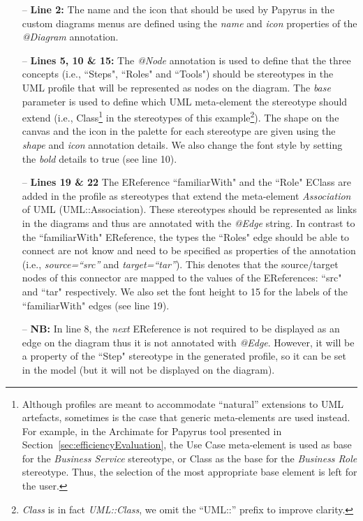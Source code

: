 \begin{itemize}
	\item[--] \textbf{Line 2:} The name and the icon that should be used by Papyrus in the custom diagrams menus are defined using the \textit{name} and \textit{icon} properties of the \textit{@Diagram} annotation.
	\item[--] \textbf{Lines 5, 10 \& 15:} The \textit{@Node} annotation is used to define that the three concepts (i.e., ``Steps", ``Roles" and ``Tools") should be stereotypes in the UML profile that will be represented as nodes on the diagram. 
	The \textit{base} parameter is used to define which UML meta-element the stereotype should extend (i.e., Class\footnote{Although profiles are meant to accommodate ``natural'' extensions to UML artefacts, sometimes is the case that generic meta-elements are used instead. 
	For example, in the Archimate for Papyrus tool presented in Section~\ref{sec:efficiencyEvaluation}, the Use Case meta-element is used as base for the \textit{Business Service} stereotype, or Class as the base for the \textit{Business Role} stereotype. 
	Thus, the selection of the most appropriate base element is left for the user.} in the stereotypes of this example\footnote{\textit{Class} is in fact \textit{UML::Class}, we omit the ``UML::'' prefix to improve clarity.}). The shape on the canvas and the icon in the palette for each stereotype are given using the \textit{shape} and \textit{icon} annotation details. We also change the font style by setting the \textit{bold} details to true (see line 10).
	\item[--] \textbf{Lines 19 \& 22} The EReference ``familiarWith" and the ``Role" EClass are added in the profile as stereotypes that extend the meta-element \textit{Association} of UML (UML::Association). 
	These stereotypes should be represented as links in the diagrams and thus are annotated with the \textit{@Edge} string.
	In contrast to the ``familiarWith" EReference, the types the 
	``Roles" edge should be able to connect are not know and need to be 
	specified as properties of the annotation (i.e., \textit{source=``src''} 
	and \textit{target=``tar''}). 
	This denotes that the source/target nodes of this connector are mapped to the values of the
	EReferences: ``src" and ``tar" respectively. 
	We also set the font height to 15 for the labels of the ``familiarWith" edges (see line 19).
	\item[--] \textbf{NB:} In line 8, the \textit{next} EReference is not required to be displayed as an edge on the diagram thus it is not annotated with \emph{@Edge}. 
	However, it will be a property of the ``Step" stereotype in the generated profile, so it can be set in the model (but it will not be displayed on the diagram).
\end{itemize}

